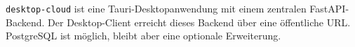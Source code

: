 \begin{beginnerstatement}

\texttt{desktop-cloud} ist eine Tauri-Desktopanwendung mit einem zentralen
FastAPI-Backend. Der Desktop-Client erreicht dieses Backend über eine
öffentliche URL. PostgreSQL ist möglich, bleibt aber eine optionale
Erweiterung.

\end{beginnerstatement}
